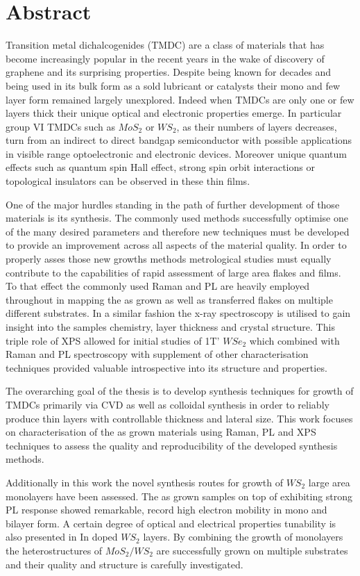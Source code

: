 \section*{Abstract}

Transition metal dichalcogenides (TMDC) are a class of materials that has become increasingly popular in the recent years in the wake of discovery of graphene and its surprising properties. Despite being known for decades and being used in its bulk form as a sold lubricant or catalysts their mono and few layer form remained largely unexplored. Indeed when TMDCs are only one or few layers thick their unique optical and electronic properties emerge. In particular group VI TMDCs such as $MoS_2$ or $WS_2$, as their numbers of layers decreases, turn from an indirect to direct bandgap semiconductor with possible applications in visible range optoelectronic and electronic devices. Moreover unique quantum effects such as quantum spin Hall effect, strong spin orbit interactions or topological insulators can be observed in these thin films.

One of the major hurdles standing in the path of further development of those materials is its synthesis. The commonly used methods successfully optimise one of the many desired parameters and therefore new techniques must be developed to provide an improvement across all aspects of the material quality. In order to properly asses those new growths methods metrological studies must equally contribute to the capabilities of rapid assessment of large area flakes and films. To that effect the commonly used Raman and PL are heavily employed throughout in mapping the as grown as well as transferred flakes on multiple different substrates. In a similar fashion the x-ray spectroscopy is utilised to gain insight into the samples chemistry, layer thickness and crystal structure. This triple role of XPS allowed for initial studies of 1T' $WSe_2$ which combined with Raman and PL spectroscopy with supplement of other characterisation techniques provided valuable introspective into its structure and properties.

The overarching goal of the thesis is to develop synthesis techniques for growth of TMDCs primarily via CVD as well as colloidal synthesis in order to reliably produce thin layers with controllable thickness and lateral size. This work focuses on characterisation of the as grown materials using Raman, PL and XPS techniques to assess the quality and reproducibility of the developed synthesis methods.

Additionally in this work the novel synthesis routes for growth of $WS_2$ large area monolayers have been assessed. The as grown samples on top of exhibiting strong PL response showed remarkable, record high electron mobility in mono and bilayer form. A certain degree of optical and electrical properties tunability is also presented in In doped $WS_2$ layers. By combining the growth of monolayers the heterostructures of $MoS_2/WS_2$ are successfully grown on multiple substrates and their quality and structure is carefully investigated.